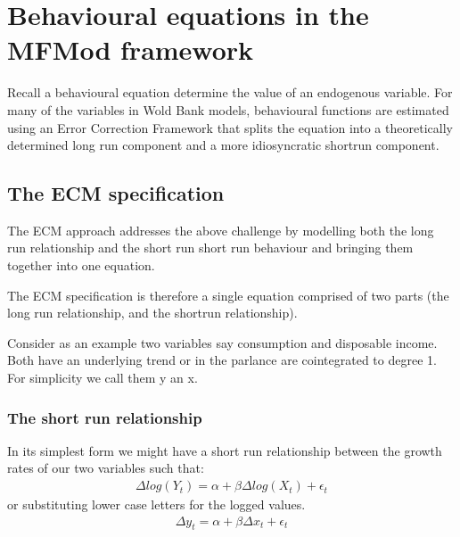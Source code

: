 \documentclass[letterpaper,10pt,english]{jupyterBook}
\begin{document}
\chapter{Behavioural equations in the MFMod framework}
\label{\detokenize{content/06_WBModels/LoadingWBModel:behavioural-equations-in-the-mfmod-framework}}
\sphinxAtStartPar
Recall a behavioural equation determine the value of an endogenous variable. For many of the variables in Wold Bank models, behavioural functions are estimated using an Error Correction Framework that splits the equation into a theoretically determined long run component and a more idiosyncratic short\sphinxhyphen{}run component.


\section{The ECM specification}
\label{\detokenize{content/06_WBModels/LoadingWBModel:the-ecm-specification}}
\sphinxAtStartPar
The ECM approach addresses the above challenge by modelling both the long run relationship and the short run short run behaviour and bringing them together into one equation.

\sphinxAtStartPar
The ECM specification is therefore a single equation comprised of two parts (the long run relationship, and the short\sphinxhyphen{}run relationship).

\sphinxAtStartPar
Consider as an example two variables say consumption and disposable income.  Both have an underlying trend or in the parlance are co\sphinxhyphen{}integrated to degree 1.  For simplicity we call them y an x.


\subsection{The short run relationship}
\label{\detokenize{content/06_WBModels/LoadingWBModel:the-short-run-relationship}}
\sphinxAtStartPar
In its simplest form we might have a short run relationship between the growth rates of our two variables such that:
\begin{equation*}
\begin{split} \Delta log(Y_t) = \alpha + \beta \Delta log(X_t) +\epsilon_t \end{split}
\end{equation*}
\sphinxAtStartPar
or substituting lower case letters for the logged values.
\begin{equation*}
\begin{split} \Delta y_t = \alpha + \beta \Delta x_t +\epsilon_t \end{split}
\end{equation*}
\end{document}
